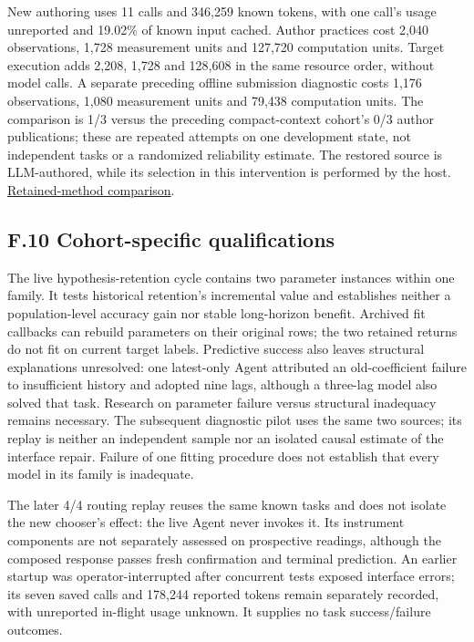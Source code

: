 \documentclass[11pt,a4paper]{article}
\begin{document}
New authoring uses 11 calls and 346,259 known tokens, with one call's usage
unreported and 19.02\% of known input cached. Author practices cost 2,040
observations, 1,728 measurement units and 127,720 computation units. Target
execution adds 2,208, 1,728 and 128,608 in the same resource order, without model
calls. A separate preceding offline submission diagnostic costs 1,176
observations, 1,080 measurement units and 79,438 computation units. The comparison
is 1/3 versus the preceding compact-context cohort's 0/3 author publications;
these are repeated attempts on one development state, not independent tasks or
a randomized reliability estimate. The restored source is LLM-authored, while
its selection in this intervention is performed by the host.
\hyperlink{artifact-96}{Retained-method comparison}.


\subsection*{F.10 Cohort-specific qualifications}

The live hypothesis-retention cycle contains two parameter instances within one
family. It tests historical retention's incremental value and establishes neither
a population-level accuracy gain nor stable long-horizon benefit. Archived fit
callbacks can rebuild parameters on their original rows; the two retained returns
do not fit on current target labels. Predictive success also leaves structural
explanations unresolved: one latest-only Agent attributed an old-coefficient
failure to insufficient history and adopted nine lags, although a three-lag model
also solved that task. Research on parameter failure versus structural inadequacy
remains necessary. The subsequent diagnostic pilot uses the same two sources;
its replay is neither an independent sample nor an isolated causal estimate of
the interface repair. Failure of one fitting procedure does not establish that
every model in its family is inadequate.


The later 4/4 routing replay reuses the same known tasks and does not isolate the
new chooser's effect: the live Agent never invokes it. Its instrument components
are not separately assessed on prospective readings, although the composed
response passes fresh confirmation and terminal prediction. An earlier startup
was operator-interrupted after concurrent tests exposed interface errors; its
seven saved calls and 178,244 reported tokens remain separately recorded, with
unreported in-flight usage unknown. It supplies no task success/failure outcomes.
\end{document}
